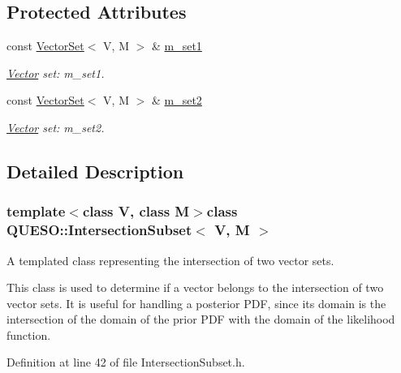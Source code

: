 \subsection*{Protected Attributes}
\begin{DoxyCompactItemize}
\item 
const \hyperlink{class_q_u_e_s_o_1_1_vector_set}{Vector\-Set}$<$ V, M $>$ \& \hyperlink{class_q_u_e_s_o_1_1_intersection_subset_a0b7b665d6b283d3cfe154f4b52f2b7f6}{m\-\_\-set1}
\begin{DoxyCompactList}\small\item\em \hyperlink{class_q_u_e_s_o_1_1_vector}{Vector} set\-: m\-\_\-set1. \end{DoxyCompactList}\item 
const \hyperlink{class_q_u_e_s_o_1_1_vector_set}{Vector\-Set}$<$ V, M $>$ \& \hyperlink{class_q_u_e_s_o_1_1_intersection_subset_adb82477167bf58ce2a9fb79e0bbccb96}{m\-\_\-set2}
\begin{DoxyCompactList}\small\item\em \hyperlink{class_q_u_e_s_o_1_1_vector}{Vector} set\-: m\-\_\-set2. \end{DoxyCompactList}\end{DoxyCompactItemize}


\subsection{Detailed Description}
\subsubsection*{template$<$class V, class M$>$class Q\-U\-E\-S\-O\-::\-Intersection\-Subset$<$ V, M $>$}

A templated class representing the intersection of two vector sets. 

This class is used to determine if a vector belongs to the intersection of two vector sets. It is useful for handling a posterior P\-D\-F, since its domain is the intersection of the domain of the prior P\-D\-F with the domain of the likelihood function. 

Definition at line 42 of file Intersection\-Subset.\-h.



